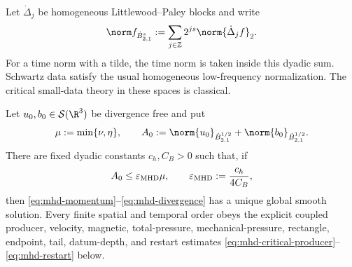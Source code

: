 Let \(\dot\Delta_j\) be homogeneous Littlewood--Paley blocks and write
\begin{equation}
 \norm f_{\dot B^s_{2,1}}
 :=\sum_{j\in\mathbb Z}2^{js}\norm{\dot\Delta_jf}_2.
 \label{eq:mhd-besov-norm}
\end{equation}
For a time norm with a tilde, the time norm is taken inside this dyadic sum.
Schwartz data satisfy the usual homogeneous low-frequency normalization.
The critical small-data theory in these spaces is classical.

\begin{theorem}
\label{thm:quantitative-mhd-jet}
Let \(u_0,b_0\in\mathcal S(\R^3)\) be divergence free and put
\begin{equation}
 \mu:=\min\{\nu,\eta\},
 \qquad
 A_0:=\norm{u_0}_{\dot B^{1/2}_{2,1}}
      +\norm{b_0}_{\dot B^{1/2}_{2,1}}.
 \label{eq:mhd-data-size}
\end{equation}
There are fixed dyadic constants \(c_h,C_B>0\) such that, if
\begin{equation}
 A_0\le\varepsilon_{\rm MHD}\mu,
 \qquad
 \varepsilon_{\rm MHD}:=\frac{c_h}{4C_B},
 \label{eq:mhd-smallness}
\end{equation}
then \eqref{eq:mhd-momentum}--\eqref{eq:mhd-divergence} has a unique global
smooth solution.  Every finite spatial and temporal order obeys the explicit
coupled producer, velocity, magnetic, total-pressure, mechanical-pressure,
rectangle, endpoint, tail, datum-depth, and restart estimates
\eqref{eq:mhd-critical-producer}--\eqref{eq:mhd-restart} below.
\end{theorem}

